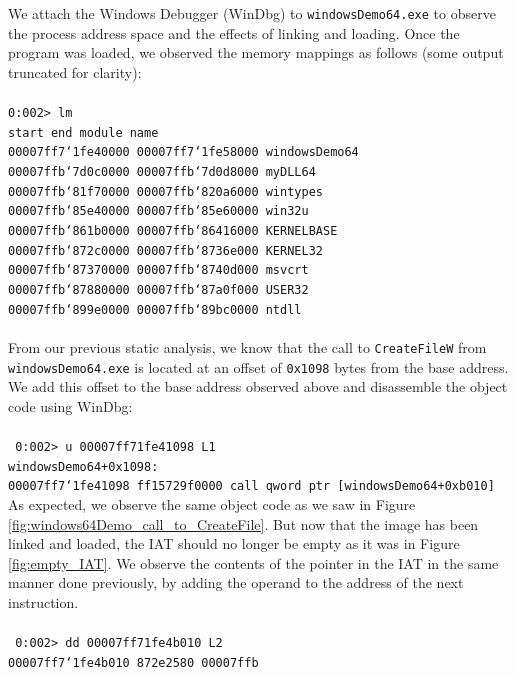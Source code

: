 \documentclass[preprint,12pt]{elsarticle}
\begin{document}
We attach the Windows Debugger (WinDbg) to \texttt{windowsDemo64.exe} to observe the process address space and the effects of linking and loading. Once the program was loaded, we observed the memory mappings as follows (some output truncated for clarity):\\\\
{\footnotesize{\texttt{0:002> lm\\
start \space\space\space\space\space\space\space\space\space\space\space\space end \space\space\space\space\space\space\space\space\space\space\space\space\space\space module name\\
00007ff7`1fe40000 00007ff7`1fe58000   windowsDemo64\\
00007ffb`7d0c0000 00007ffb`7d0d8000   myDLL64\\
00007ffb`81f70000 00007ffb`820a6000   wintypes\\
00007ffb`85e40000 00007ffb`85e60000   win32u\\
00007ffb`861b0000 00007ffb`86416000   KERNELBASE\\
00007ffb`872c0000 00007ffb`8736e000   KERNEL32\\
00007ffb`87370000 00007ffb`8740d000   msvcrt\\
00007ffb`87880000 00007ffb`87a0f000   USER32\\
00007ffb`899e0000 00007ffb`89bc0000   ntdll\\
}}}
\\From our previous static analysis, we know that the call to \texttt{CreateFileW} from \texttt{windowsDemo64.exe} is located at an offset of \texttt{0x1098} bytes from the base address. We add this offset to the base address observed above and disassemble the object code using WinDbg:\\\\
{\footnotesize{\texttt{
0:002> u 00007ff71fe41098 L1\\
windowsDemo64+0x1098:\\
00007ff7`1fe41098 ff15729f0000  call qword ptr [windowsDemo64+0xb010]
}}}
\\As expected, we observe the same object code as we saw in Figure \ref{fig:windows64Demo_call_to_CreateFile}. But now that the image has been linked and loaded, the IAT should no longer be empty as it was in Figure \ref{fig:empty_IAT}. We observe the contents of the pointer in the IAT in the same manner done previously, by adding the operand to the address of the next instruction.\\\\
{\footnotesize{\texttt{
0:002> dd 00007ff71fe4b010 L2\\
00007ff7`1fe4b010  872e2580 00007ffb
}}}
\end{document}
